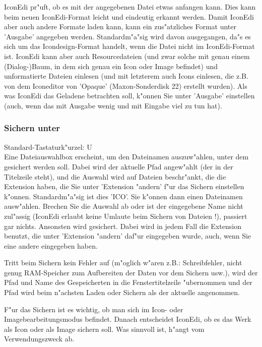 IconEdi pr"uft, ob es mit der angegebenen Datei etwas anfangen kann. 
Dies kann beim neuen IconEdi-Format leicht und eindeutig erkannt 
werden. Damit IconEdi aber auch andere Formate laden kann, kann ein 
zus"atzliches Format unter 'Ausgabe' angegeben werden. Standardm"a"sig 
wird davon ausgegangen, da"s es sich um das Icondesign-Format 
handelt, wenn die Datei nicht im IconEdi-Format ist. IconEdi kann 
aber auch Resourcedateien (und zwar solche mit genau einem 
(Dialog-)Baum, in dem sich genau ein Icon oder Image befindet) und 
unformatierte Dateien einlesen (und mit letzterem auch Icons 
einlesen, die z.B. von dem Iconeditor von 'Opaque' 
(Maxon-Sonderdisk 22) erstellt wurden). Als was IconEdi das 
Geladene betrachten soll, k"onnen Sie unter 'Ausgabe' einstellen
(auch, wenn das mit Ausgabe wenig und mit Eingabe viel zu tun hat).

\subsubsection{Sichern unter}
Standard-Tastaturk"urzel: {\control}U \\ 
Eine Dateiauswahlbox erscheint, um den Dateinamen auszuw"ahlen, 
unter dem gesichert werden soll. Dabei wird der aktuelle Pfad 
angew"ahlt (der in der Titelzeile steht), und die Auswahl wird auf 
Dateien beschr"ankt, die die Extension haben, die Sie unter 
'Extension "andern' f"ur das Sichern einstellen k"onnen.
Standardm"a"sig ist dies 'ICO'. Sie k"onnen dann einen Dateinamen 
ausw"ahlen. Brechen Sie die Auswahl ab oder ist der eingegebene 
Name nicht zul"assig (IconEdi erlaubt keine Umlaute beim Sichern 
von Dateien !), passiert gar nichts. Ansonsten wird gesichert. 
Dabei wird in jedem Fall die Extension benutzt, die unter 
'Extension "andern' daf"ur eingegeben wurde, auch, wenn Sie eine 
andere eingegeben haben.

Tritt beim Sichern kein Fehler auf (m"oglich w"aren z.B.: 
Schreibfehler, nicht genug RAM-Speicher zum Aufbereiten der Daten 
vor dem Sichern usw.), wird der Pfad und Name des Gespeicherten 
in die Fenstertitelzeile "ubernommen und der Pfad wird beim 
n"achsten Laden oder Sichern als der aktuelle angenommen.

F"ur das Sichern ist es wichtig, ob man sich im Icon- oder 
Imagebearbeitungsmodus befindet. Danach entscheidet IconEdi, ob es
das Werk als Icon oder als Image sichern soll. Was sinnvoll ist, 
h"angt vom Verwendungszweck ab.

